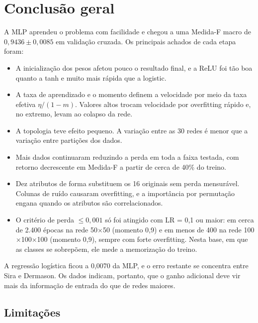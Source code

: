 \section{Conclusão geral}

A MLP aprendeu o problema com facilidade e chegou a uma Medida-F macro de $0{,}9436 \pm 0{,}0085$ em validação cruzada. Os principais achados de cada etapa foram:

\begin{itemize}
  \item A inicialização dos pesos afetou pouco o resultado final, e a ReLU foi tão boa quanto a tanh e muito mais rápida que a logistic.
  \item A taxa de aprendizado e o momento definem a velocidade por meio da taxa efetiva $\eta/(1-m)$. Valores altos trocam velocidade por overfitting rápido e, no extremo, levam ao colapso da rede.
  \item A topologia teve efeito pequeno. A variação entre as 30 redes é menor que a variação entre partições dos dados.
  \item Mais dados continuaram reduzindo a perda em toda a faixa testada, com retorno decrescente em Medida-F a partir de cerca de 40\% do treino.
  \item Dez atributos de forma substituem os 16 originais sem perda mensurável. Colunas de ruído causaram overfitting, e a importância por permutação engana quando os atributos são correlacionados.
  \item O critério de perda $\le 0{,}001$ só foi atingido com LR = 0,1 ou maior: em cerca de 2.400 épocas na rede 50$\times$50 (momento 0,9) e em menos de 400 na rede 100$\times$100$\times$100 (momento 0,9), sempre com forte overfitting. Nesta base, em que as classes se sobrepõem, ele mede a memorização do treino.
\end{itemize}

A regressão logística ficou a 0,0070 da MLP, e o erro restante se concentra entre Sira e Dermason. Os dados indicam, portanto, que o ganho adicional deve vir mais da informação de entrada do que de redes maiores.

\subsection*{Limitações}

